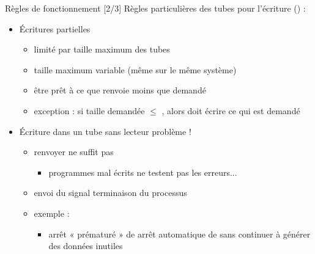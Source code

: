 \begin {frame} {Règles de fonctionnement [2/3]}
    Règles particulières des tubes pour l'écriture () :

    \begin {itemize}
	\item Écritures partielles
	    \begin {itemize}
		\item {} limité par taille maximum des tubes
		\item taille maximum variable (même sur le même système)
		\item \implique être prêt à ce que 
		    renvoie moins que demandé
		\item exception : si taille demandée $\leq$ ,
		    alors  doit écrire ce qui est demandé

	    \end {itemize}

	\item Écriture dans un tube sans lecteur
	    \implique problème !
	    \begin {itemize}
		\item renvoyer  ne suffit pas
		    \begin {itemize}
			\item programmes mal écrits ne testent pas
			    les erreurs...
		    \end {itemize}
		\item envoi du signal  \implique
		    terminaison du processus
		\item exemple : 
		    \begin {itemize}
			\item arrêt « prématuré » de  \implique
			    arrêt automatique de 
			    sans continuer à générer des données inutiles
		    \end {itemize}
	    \end {itemize}
    \end {itemize}
\end {frame}

